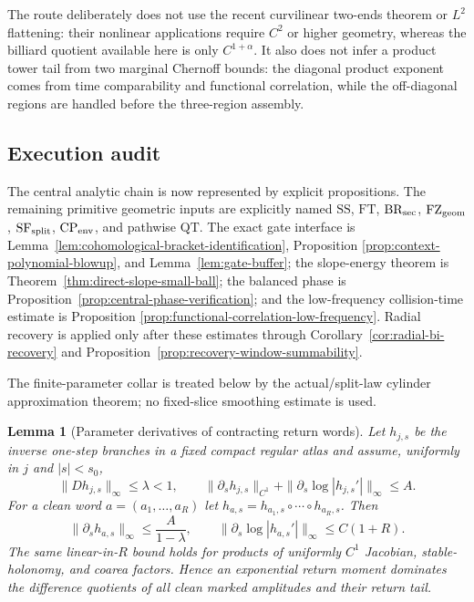 \documentclass[11pt]{article}
\newtheorem{lemma}[theorem]{Lemma}
\begin{document}
The route deliberately does not use the recent curvilinear two-ends theorem
or $L^2$ flattening: their nonlinear applications require $C^2$ or higher
geometry, whereas the billiard quotient available here is only
$C^{1+\alpha}$.  It also does not infer a product tower tail from two
marginal Chernoff bounds: the diagonal product exponent comes from time
comparability and functional correlation, while the off-diagonal regions are
handled before the three-region assembly.

\subsection{Execution audit}

The central analytic chain is now represented by explicit propositions.
The remaining primitive geometric inputs are explicitly named
$\mathrm{SS}$, $\mathrm{FT}$, $\mathrm{BR}_{\rm sec}$,
$\mathrm{FZ}_{\rm geom}$,
$\mathrm{SF}_{\rm split}$, $\mathrm{CP}_{\rm env}$, and pathwise
$\mathrm{QT}$.  The exact gate interface is
Lemma~\ref{lem:cohomological-bracket-identification}, Proposition
\ref{prop:context-polynomial-blowup}, and Lemma~\ref{lem:gate-buffer}; the
slope-energy theorem is Theorem~\ref{thm:direct-slope-small-ball}; the
balanced phase is Proposition~\ref{prop:central-phase-verification}; and the
low-frequency collision-time estimate is Proposition
\ref{prop:functional-correlation-low-frequency}.  Radial recovery is applied
only after these estimates through Corollary~\ref{cor:radial-bi-recovery} and
Proposition~\ref{prop:recovery-window-summability}.

The finite-parameter collar is treated below by the actual/split-law cylinder
approximation theorem; no fixed-slice smoothing estimate is used.

\begin{lemma}[Parameter derivatives of contracting return words]
\label{lem:parametric-inverse-word}
Let $h_{j,s}$ be the inverse one-step branches in a fixed compact regular
atlas and assume, uniformly in $j$ and $|s|<s_0$,
\[
 \|Dh_{j,s}\|_\infty\le\lambda<1,
 \qquad
 \|\partial_sh_{j,s}\|_{C^1}
 +\|\partial_s\log|h_{j,s}'|\|_\infty\le A.
\]
For a clean word $a=(a_1,\ldots,a_R)$ let
$h_{a,s}=h_{a_1,s}\circ\cdots\circ h_{a_R,s}$.  Then
\begin{equation}
\label{eq:parametric-word-bounds}
 \|\partial_s h_{a,s}\|_\infty\le \frac{A}{1-\lambda},
 \qquad
 \|\partial_s\log|h_{a,s}'|\|_\infty\le C(1+R).
\end{equation}
The same linear-in-$R$ bound holds for products of uniformly $C^1$
Jacobian, stable-holonomy, and coarea factors.  Hence an exponential return
moment dominates the difference quotients of all clean marked amplitudes and
their return tail.
\end{lemma}
\end{document}
